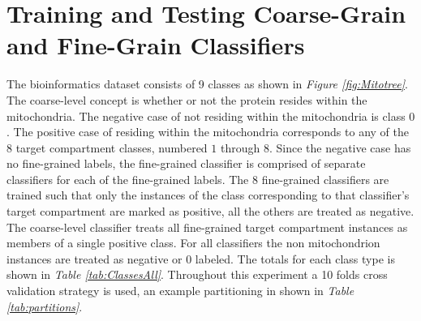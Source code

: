 \documentclass[ms]{nuthesis}
\begin{document}
\section{Training and Testing Coarse-Grain and Fine-Grain Classifiers}
\par The bioinformatics dataset consists of 9 classes as shown in
\textit{Figure \ref{fig:Mitotree}}. The coarse-level concept is whether or not
the protein resides within the mitochondria. The negative case of not residing within the mitochondria is class $0$.
The positive case of residing within the
  mitochondria corresponds to any of the $8$ target compartment classes,  numbered $1$ through $8$. Since the
  negative case has no fine-grained labels, the fine-grained classifier is comprised of separate classifiers
  for each of the fine-grained labels. The $8$ fine-grained classifiers are trained such that only the instances of
  the class corresponding to that classifier's target compartment are marked as positive, all the others are treated
  as negative. The coarse-level classifier treats all fine-grained target compartment
  instances as members of a single positive class. For all classifiers the non mitochondrion instances are treated as
  negative or $0$ labeled. The totals for each class type is shown in \textit{Table \ref{tab:ClassesAll}}. Throughout
  this experiment a 10 folds cross validation strategy is used, an example partitioning in shown in
  \textit{Table \ref{tab:partitions}}.
\end{document}
